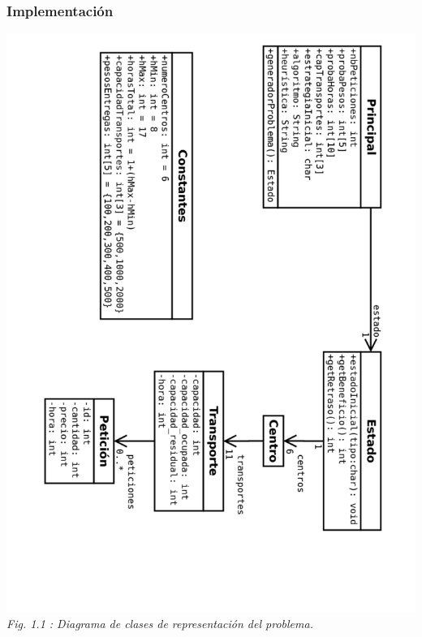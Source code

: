 \documentclass{article}
\begin{document}
\subsubsection{Implementación}
\begin{center} \includegraphics[width=14cm, angle=90]{clases}\\
{\it Fig. 1.1 : Diagrama de clases de representación del problema.} \end{center}
\end{document}

